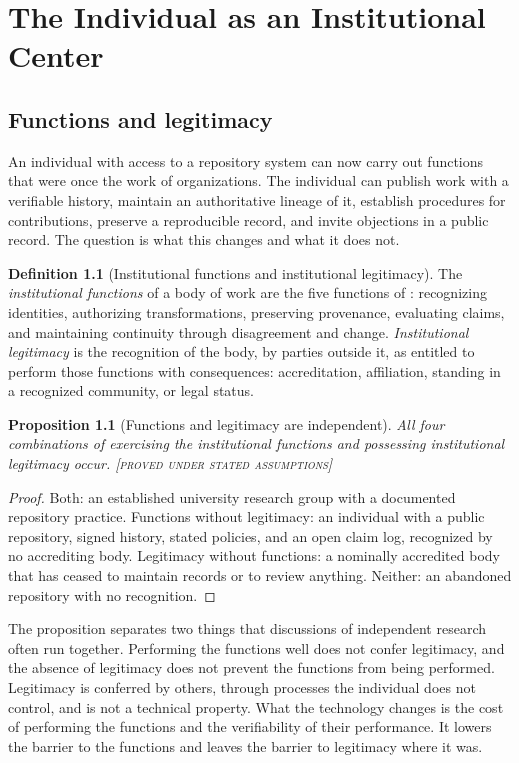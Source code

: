 \documentclass[11pt,twoside,openright]{book}
\theoremstyle{plain}
\newtheorem{proposition}[theorem]{Proposition}
\theoremstyle{definition}
\newtheorem{definition}[theorem]{Definition}
\theoremstyle{remark}
\newcommand{\Proved}{\textup{\textsc{[proved under stated assumptions]}}}
\begin{document}
\chapter{The Individual as an Institutional Center}\label{ch:individual}

\section{Functions and legitimacy}

An individual with access to a repository system can now carry out functions that were once the work of organizations. The individual can publish work with a verifiable history, maintain an authoritative lineage of it, establish procedures for contributions, preserve a reproducible record, and invite objections in a public record. The question is what this changes and what it does not.

\begin{definition}[Institutional functions and institutional legitimacy]\label{def:funclegit}
The \emph{institutional functions} of a body of work are the five functions of : recognizing identities, authorizing transformations, preserving provenance, evaluating claims, and maintaining continuity through disagreement and change. \emph{Institutional legitimacy} is the recognition of the body, by parties outside it, as entitled to perform those functions with consequences: accreditation, affiliation, standing in a recognized community, or legal status.
\end{definition}

\begin{proposition}[Functions and legitimacy are independent]\label{prop:funclegit}
All four combinations of exercising the institutional functions and possessing institutional legitimacy occur.
\Proved{}
\end{proposition}

\begin{proof}
Both: an established university research group with a documented repository practice. Functions without legitimacy: an individual with a public repository, signed history, stated policies, and an open claim log, recognized by no accrediting body. Legitimacy without functions: a nominally accredited body that has ceased to maintain records or to review anything. Neither: an abandoned repository with no recognition.
\end{proof}

The proposition separates two things that discussions of independent research often run together. Performing the functions well does not confer legitimacy, and the absence of legitimacy does not prevent the functions from being performed. Legitimacy is conferred by others, through processes the individual does not control, and is not a technical property. What the technology changes is the cost of performing the functions and the verifiability of their performance. It lowers the barrier to the functions and leaves the barrier to legitimacy where it was.
\end{document}
